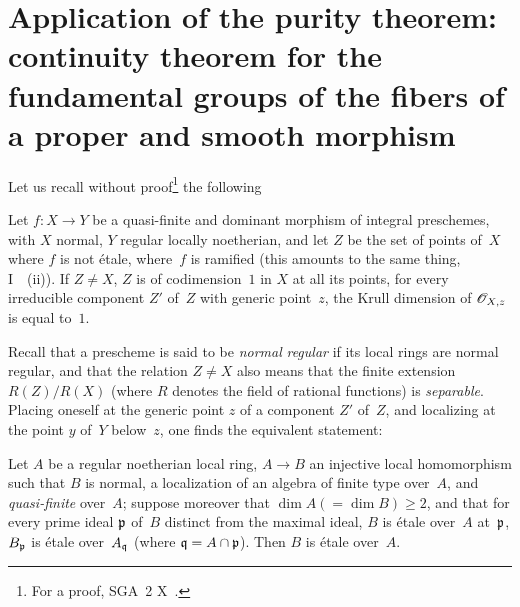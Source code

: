 \section[Application of the purity theorem]{Application of the purity theorem:
continuity theorem for the fundamental groups of the
fibers of a proper and smooth morphism}
\label{X.3}

Let us recall without proof\footnote{For a proof, \cf SGA~2 X~.} the
following

\begin{puritytheorem}
\label{X.3.1}
Let $f\colon X\to Y$ be a
quasi-finite and dominant morphism of integral preschemes, with $X$
normal, $Y$ regular locally noetherian, and let $Z$ be
the set of points of~$X$ where $f$ is not \'etale,
\ie where~$f$ is ramified (this amounts to the same thing,
\textup{I~~(ii)}). If $Z\ne X$, $Z$ is of codimension~$1$ in
$X$ at all its points, \ie for every irreducible component
$Z'$ of~$Z$ with generic point~$z$, the Krull dimension of
$\cal{O}_{X,z}$ is equal to~$1$.
\end{puritytheorem}

Recall that a prescheme is said to be \emph{normal}
\resp \emph{regular} if its local rings are normal
\resp regular, and that the relation $Z\ne X$ also means that
the finite extension $R(Z)/R(X)$ (where $R$ denotes the field of
rational functions) is \emph{separable}. Placing oneself at
the generic point $z$ of a component $Z'$ of~$Z$, and
localizing at the point $y$ of~$Y$ below~$z$, one finds
the equivalent statement:

\begin{corollary}
\label{X.3.2}
Let $A$ be a regular noetherian local ring, $A\to B$ an
injective local homomorphism such that $B$ is normal, a localization
of an algebra of finite type over~$A$, and \emph{quasi-finite} over~$A$;
suppose moreover that $\dim A (=\dim B)\ge 2$, and that for every
prime ideal $\mathfrak{p}$ of~$B$ distinct from the maximal ideal,
$B$ is \'etale over~$A$ at~$\mathfrak{p}$, \ie $B_\mathfrak{p}$ is
\'etale over~$A_\mathfrak{q}$ (where $\mathfrak{q}=A\cap\mathfrak{p}$). Then
$B$ is \'etale over~$A$.
\end{corollary}

